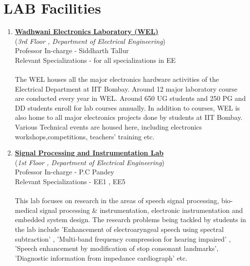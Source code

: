 \documentclass[openany]{book} %
\begin{document}
\chapter{LAB Facilities}
\begin{enumerate}
    \item \href{https://www.ee.iitb.ac.in/~wel_iitb/}{\color{blue}  \textbf{Wadhwani Electronics Laboratory (WEL)}}\\
    (\textit{3rd Floor ,  Department of Electrical Engineering})\\
    Professor In-charge - Siddharth Tallur\\
Relevant Specializations - for all specializations in EE\\
\\
The WEL houses all the major electronics hardware activities of the Electrical Department at IIT Bombay. Around 12 major laboratory course are conducted every year in WEL. Around 650 UG students and 250 PG and DD students enroll for lab courses annually. In addition to courses, WEL is also home to all major electronics projects done by students at IIT Bombay. Various Technical events are housed here, including electronics workshops,competitions, teachers' training etc.\\

\item \href{http://www.ee.iitb.ac.in/~spilab} {\color{blue}  \textbf{Signal Processing and Instrumentation Lab} }\\
    (\textit{1st Floor ,  Department of Electrical Engineering})\\
    Professor In-charge - P.C Pandey\\
Relevant Specializations - EE1 , EE5\\
\\
This lab focuses on research in the areas of speech signal processing, bio-medical signal processing \& instrumentation, electronic instrumentation and embedded system design. The research problems being tackled by students in the lab include 'Enhancement of electroaryngeal speech using spectral subtraction' , 'Multi-band frequency compression for hearing impaired' , 'Speech enhancement by modification of stop consonant landmarks', 'Diagnostic information from impedance cardiograph' etc.\\



\end{enumerate}
\end{document}

